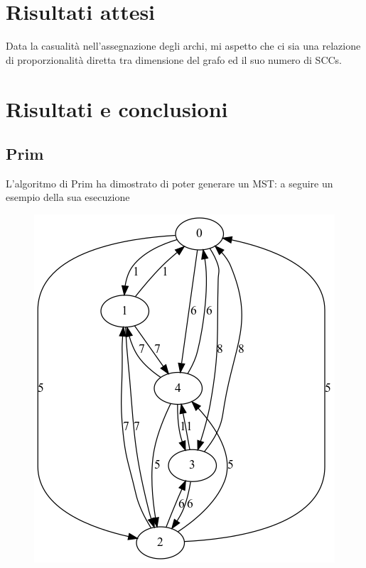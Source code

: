 \documentclass{article}
\begin{document}
\section{Risultati attesi}
Data la casualità nell'assegnazione degli archi, mi aspetto che ci sia una relazione di proporzionalità diretta tra dimensione del grafo ed il suo numero di SCCs.
\newpage
\section{Risultati e conclusioni}
\subsection{Prim}
L'algoritmo di Prim ha dimostrato di poter generare un MST: a seguire un esempio della sua esecuzione
\begin{figure}[h]
\centering
\includegraphics[width=0.5\linewidth]
{"./output/graph_prim.png"}
\label{graph}
\end{figure}
\end{document}
